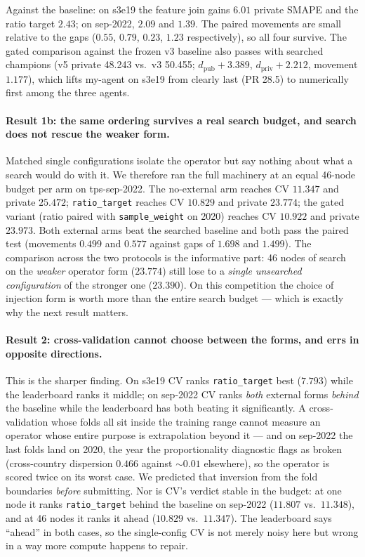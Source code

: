 \documentclass[11pt,a4paper]{article}
\begin{document}
Against the baseline: on s3e19 the feature join gains $6.01$ private SMAPE and the ratio target $2.43$; on sep-2022, $2.09$ and $1.39$. The paired movements are small relative to the gaps ($0.55$, $0.79$, $0.23$, $1.23$ respectively), so all four survive. The gated comparison against the frozen v3 baseline also passes with searched champions (v5 private 48.243 vs.\ v3 50.455; $d_{\mathrm{pub}}{+}3.389$, $d_{\mathrm{priv}}{+}2.212$, movement $1.177$), which lifts my-agent on s3e19 from clearly last (PR 28.5) to numerically first among the three agents.

\paragraph{Result 1b: the same ordering survives a real search budget, and search does not rescue the weaker form.} Matched single configurations isolate the operator but say nothing about what a search would do with it. We therefore ran the full machinery at an equal 46-node budget per arm on tps-sep-2022. The no-external arm reaches CV $11.347$ and private $25.472$; \texttt{ratio\_target} reaches CV $10.829$ and private $23.774$; the gated variant (ratio paired with \texttt{sample\_weight} on 2020) reaches CV $10.922$ and private $23.973$. Both external arms beat the searched baseline and both pass the paired test (movements $0.499$ and $0.577$ against gaps of $1.698$ and $1.499$). The comparison across the two protocols is the informative part: 46 nodes of search on the \emph{weaker} operator form ($23.774$) still lose to a \emph{single unsearched configuration} of the stronger one ($23.390$). On this competition the choice of injection form is worth more than the entire search budget --- which is exactly why the next result matters.

\paragraph{Result 2: cross-validation cannot choose between the forms, and errs in opposite directions.} This is the sharper finding. On s3e19 CV ranks \texttt{ratio\_target} best ($7.793$) while the leaderboard ranks it middle; on sep-2022 CV ranks \emph{both} external forms \emph{behind} the baseline while the leaderboard has both beating it significantly. A cross-validation whose folds all sit inside the training range cannot measure an operator whose entire purpose is extrapolation beyond it --- and on sep-2022 the last folds land on 2020, the year the proportionality diagnostic flags as broken (cross-country dispersion $0.466$ against ${\sim}0.01$ elsewhere), so the operator is scored twice on its worst case. We predicted that inversion from the fold boundaries \emph{before} submitting. Nor is CV's verdict stable in the budget: at one node it ranks \texttt{ratio\_target} behind the baseline on sep-2022 ($11.807$ vs.\ $11.348$), and at 46 nodes it ranks it ahead ($10.829$ vs.\ $11.347$). The leaderboard says ``ahead'' in both cases, so the single-config CV is not merely noisy here but wrong in a way more compute happens to repair.
\end{document}
